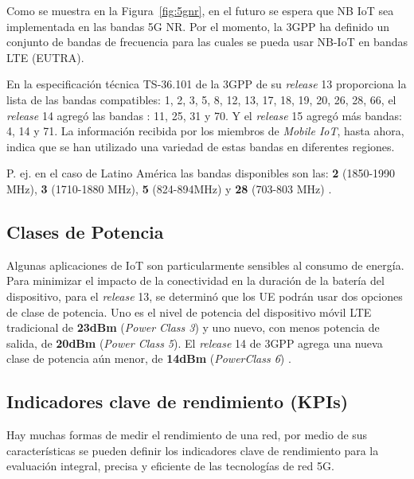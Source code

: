 Como se muestra en la Figura~\ref{fig:5gnr}, en el futuro se espera que NB IoT sea implementada en las bandas 5G NR. Por el momento, la 3GPP ha definido un conjunto de bandas de frecuencia para las cuales se pueda usar NB-IoT en bandas LTE (EUTRA). \newline

En la especificación técnica TS-36.101 de la 3GPP de su \textit{release} 13 proporciona la lista de las bandas compatibles: 1, 2, 3, 5, 8, 12, 13, 17, 18, 19, 20, 26, 28, 66, el \textit{release} 14 agregó las bandas : 11, 25, 31 y 70. Y el \textit{release} 15 agregó más bandas: 4, 14 y 71. La información recibida por los miembros de \textit{Mobile IoT}, hasta ahora, indica que se han utilizado una variedad de estas bandas en diferentes regiones\parencite{NBIoTDeploymentGSMA}.\newline

P. ej. en el caso de Latino América las bandas disponibles son las: \textbf{2} (1850-1990 MHz), \textbf{3} (1710-1880 MHz), \textbf{5} (824-894MHz) y \textbf{28} (703-803 MHz) \parencite{NBIoTDeploymentGSMA}.\newline

\subsection{Clases de Potencia}

Algunas aplicaciones de IoT son particularmente sensibles al consumo de energía. Para minimizar el impacto de la conectividad en la duración de la batería del dispositivo, para el \textit{release} 13, se determinó que los UE podrán usar dos opciones de clase de potencia. Uno es el nivel de potencia del dispositivo móvil LTE tradicional de \textbf{23dBm} (\textit{Power Class 3}) y uno nuevo, con menos potencia de salida, de \textbf{20dBm} (\textit{Power Class 5}). El \textit{release} 14 de 3GPP agrega una nueva clase de potencia aún menor, de \textbf{14dBm} (\textit{PowerClass 6}) \parencite{NBIoTDeploymentGSMA}.

\subsection{Indicadores clave de rendimiento (KPIs)}

Hay muchas formas de medir el rendimiento de una red, por medio de sus características se pueden definir los indicadores clave de rendimiento para la evaluación integral, precisa y eficiente de las tecnologías de red 5G.\newline


